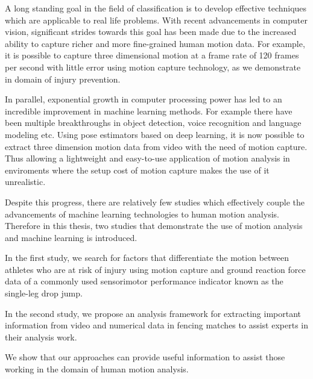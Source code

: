 A long standing goal in the field of classification is to develop effective techniques which are applicable to real life problems. With recent advancements in computer vision, significant strides towards this goal has been made due to the increased ability to capture richer and more fine-grained human motion data. For example, it is possible to capture three dimensional motion at a frame rate of 120 frames per second with little error using motion capture technology, as we demonstrate in domain of injury prevention. 

In parallel, exponential growth in computer processing power has led to an incredible improvement in machine learning methods. For example there have been multiple breakthroughs in object detection, voice recognition and language modeling etc. Using pose estimators based on deep learning, it is now possible to extract three dimension motion data from video with the need of motion capture. Thus allowing a lightweight and easy-to-use application of motion analysis in enviroments where the setup cost of motion capture makes the use of it unrealistic. 

Despite this progress, there are relatively few studies which effectively couple the advancements of machine learning technologies to human motion analysis. Therefore in this thesis, two studies that demonstrate the use of motion analysis and machine learning is introduced.

In the first study, we search for factors that differentiate the motion between athletes who are at risk of injury using motion capture and ground reaction force data of a commonly used sensorimotor performance indicator known as the single-leg drop jump.

In the second study, we propose an analysis framework for extracting important information from video and numerical data in fencing matches to assist experts in their analysis work. 

We show that our approaches can provide useful information to assist those working in the domain of human motion analysis. 